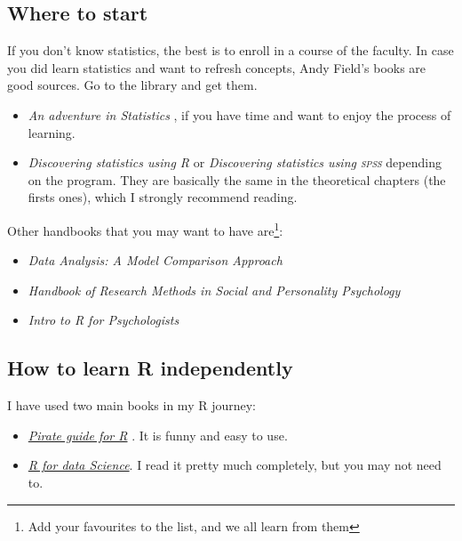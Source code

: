 \documentclass{article}
\begin{document}
\subsection{Where to start}
\label{subsec: start}
If you don’t know statistics, the best is to enroll in a course of the faculty. In case you did learn statistics and want to refresh concepts, Andy Field’s books are good sources. Go to the library and get them.
\begin{itemize}
    \item \emph{An adventure in Statistics} \citep{field2016adventure}, if you have time and want to enjoy the process of learning. 
    \item \emph{Discovering statistics using R} \citep{field2012discovering} or \emph{Discovering statistics using \textsc{spss}} \citep{field2013discovering} depending on the program. They are basically the same in the theoretical chapters (the firsts ones), which I strongly recommend reading. 
\end{itemize}

\begin{flushleft}
Other handbooks that you may want to have are\footnote{Add your favourites to the list, and we all learn from them}:
\end{flushleft}

\begin{itemize}
    \item \emph{Data Analysis: A Model Comparison Approach} \citep{judd2011data}
    \item \emph{Handbook of Research Methods in Social and Personality Psychology}\citep{reis2000handbook}
    \item \emph{Intro to R for Psychologists} \citep{nydick2013intro}

\end{itemize}


\subsection{How to learn R independently}
\label{subsec: learn R}

I have used two main books in my R journey:
\begin{itemize}
    \item \href{https://bookdown.org/ndphillips/YaRrr/}{\emph{Pirate guide for R}} \citep{phillips2017yarrr}. It is funny and easy to use.
    \item \href{https://r4ds.had.co.nz/}{\emph{R for data Science}}. I read it pretty much completely, but you may not need to.
\end{itemize}
\end{document}
